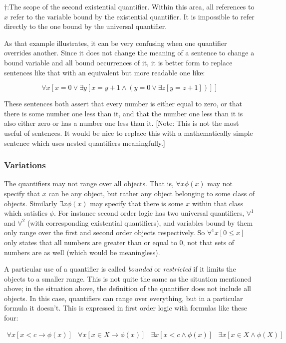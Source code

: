\documentclass[12pt]{article}
\begin{document}
$\dagger$:The scope of the second existential quantifier.  Within this area, all references to $x$ refer to the variable bound by the existential quantifier.  It is impossible to refer directly to the one bound by the universal quantifier.

As that example illustrates, it can be very confusing when one quantifier overrides another.  Since it does not change the meaning of a sentence to change a bound variable and all bound occurrences of it, it is better form to replace sentences like that with an equivalent but more readable one like:


$$\forall x [x=0 \vee \exists y [x=y+1 \wedge (y=0\vee\exists z [y=z+1])]]$$

These sentences both assert that every number is either equal to zero, or that there is some number one less than it, and that the number one less than it is also either zero or has a number one less than it.  [Note: This is not the most useful of sentences.  It would be nice to replace this with a mathematically simple sentence which uses nested quantifiers meaningfully.]

\subsubsection*{Variations}

The quantifiers may not range over all objects.  That is, $\forall x\phi(x)$ may not specify that $x$ can be any object, but rather any object belonging to some class of objects.  Similarly $\exists x\phi(x)$ may specify that there is some $x$ within that class which satisfies $\phi$.  For instance second order logic has two universal quantifiers, $\forall^1$ and $\forall^2$ (with corresponding existential quantifiers), and variables bound by them only range over the first and second order objects respectively.  So $\forall^1 x [0\leq x]$ only states that all numbers are greater than or equal to $0$, not that sets of numbers are as well (which would be meaningless).

A particular use of a quantifier is called \emph{bounded} or \emph{restricted} if it limits the objects to a smaller range.  This is not quite the same as the situation mentioned above; in the situation above, the definition of the quantifier does not include all objects.  In this case, quantifiers can range over everything, but in a particular formula it doesn't.  This is expressed in first order logic with formulas like these four:

\begin{align*}
\forall x [x<c\rightarrow \phi(x)]&
\forall x[x\in X\rightarrow \phi(x)]&
\exists x[x<c \wedge \phi(x)]&
\exists x[x\in X\wedge \phi(X)]
\end{align*}
\end{document}
